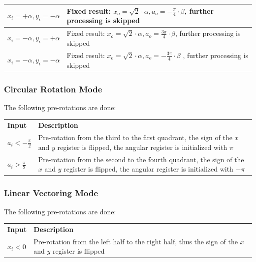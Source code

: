 \documentclass[a4paper, 12pt, notitlepage]{report}
\begin{document}
\begin{tabular}{@{}lp{380pt}@{}}
            $x_i = + \alpha, y_i = - \alpha $   &  Fixed result: $x_o = \sqrt{2} \cdot \alpha, a_o = - \frac{\pi}{4} \cdot \beta$, 
            further processing is skipped \\ \midrule

            $x_i = - \alpha, y_i = + \alpha $   &  Fixed result: $x_o = \sqrt{2} \cdot \alpha, a_o =  \frac{3 \pi}{4} \cdot \beta$, 
            further processing is skipped \\ \midrule

            $x_i = - \alpha, y_i = - \alpha $   &  Fixed result: $x_o = \sqrt{2} \cdot \alpha, a_o = - \frac{3 \pi }{4} \cdot \beta$ ,
            further processing is skipped \\ 
            \bottomrule
         \end{tabular}

      \subsubsection{Circular Rotation Mode}
      The following pre-rotations are done:\newline\newline
         \begin{tabular}{@{}lp{380pt}@{}}
            \rowcolor{tableheadcolor}\textbf{Input} &\textbf{ Description }  \\

            $a_i < - \frac{\pi}{2}$    & Pre-rotation from the third to the first quadrant, 
                                         the sign of the $x$ and $y$ register is flipped, 
                                         the angular register is initialized with $\pi$   \\ \midrule

            $a_i >   \frac{\pi}{2}$    & Pre-rotation from the second to the fourth quadrant, 
                                         the sign of the $x$ and $y$ register is flipped, 
                                         the angular register is initialized with $-\pi$   \\
            \bottomrule
         \end{tabular}

      \subsubsection{Linear Vectoring Mode}
      The following pre-rotations are done:\newline\newline
         \begin{tabular}{@{}lp{380pt}@{}}
            \rowcolor{tableheadcolor}\textbf{Input} &\textbf{ Description }  \\

            $x_i < 0$          & Pre-rotation from the left half to the right half, thus
                                 the sign of the $x$ and $y$ register is flipped \\
            \bottomrule
         \end{tabular}
\end{document}
